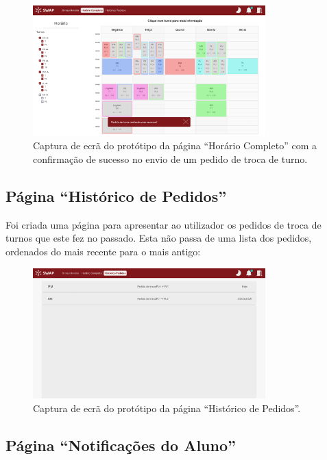 \documentclass[12pt, a4paper]{article}
\begin{document}
\begin{figure}[H]
    \centering
    \includegraphics[width=0.8\textwidth]{res/prototype/horario-completo-toast-sucesso-troca.png}
    \caption{
        \onehalfspacing
        Captura de ecrã do protótipo da página ``Horário Completo'' com a confirmação de sucesso no
        envio de um pedido de troca de turno.
    }
    \label{horario-completo-toast-sucesso-troca}
\end{figure}

\subsection{Página ``Histórico de Pedidos''}

Foi criada uma página para apresentar ao utilizador os pedidos de troca de turnos que este fez no
passado. Esta não passa de uma lista dos pedidos, ordenados do mais recente para o mais antigo:

\begin{figure}[H]
    \centering
    \includegraphics[width=0.8\textwidth]{res/prototype/historico-de-pedidos.png}
    \caption{Captura de ecrã do protótipo da página ``Histórico de Pedidos''.}
    \label{historico-de-pedidos}
\end{figure}

\subsection{Página ``Notificações do Aluno''}
\end{document}
